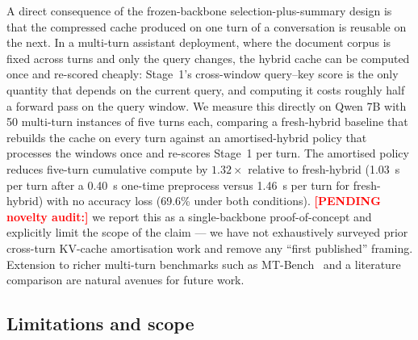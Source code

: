 \documentclass[sn-nature,Numbered]{sn-jnl}
\begin{document}
A direct consequence of the frozen-backbone selection-plus-summary design is that the compressed cache produced on one turn of a conversation is reusable on the next. In a multi-turn assistant deployment, where the document corpus is fixed across turns and only the query changes, the hybrid cache can be computed once and re-scored cheaply: Stage~1's cross-window query--key score is the only quantity that depends on the current query, and computing it costs roughly half a forward pass on the query window. We measure this directly on Qwen 7B with 50 multi-turn instances of five turns each, comparing a fresh-hybrid baseline that rebuilds the cache on every turn against an amortised-hybrid policy that processes the windows once and re-scores Stage~1 per turn. The amortised policy reduces five-turn cumulative compute by $1.32\times$ relative to fresh-hybrid (1.03~s per turn after a 0.40~s one-time preprocess versus 1.46~s per turn for fresh-hybrid) with no accuracy loss (69.6\% under both conditions). \textcolor{red}{\textbf{[PENDING novelty audit:]}} we report this as a single-backbone proof-of-concept and explicitly limit the scope of the claim --- we have not exhaustively surveyed prior cross-turn KV-cache amortisation work and remove any ``first published'' framing. Extension to richer multi-turn benchmarks such as MT-Bench~\cite{zheng2024mtbench} and a literature comparison are natural avenues for future work.

\subsection{Limitations and scope}\label{sec:limitations}
\end{document}
